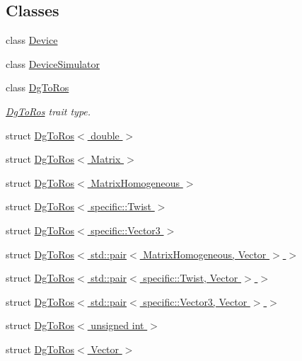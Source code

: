\subsection*{Classes}
\begin{DoxyCompactItemize}
\item 
class \hyperlink{classdynamic__graph_1_1Device}{Device}
\item 
class \hyperlink{classdynamic__graph_1_1DeviceSimulator}{Device\+Simulator}
\item 
class \hyperlink{classdynamic__graph_1_1DgToRos}{Dg\+To\+Ros}
\begin{DoxyCompactList}\small\item\em \hyperlink{classdynamic__graph_1_1DgToRos}{Dg\+To\+Ros} trait type. \end{DoxyCompactList}\item 
struct \hyperlink{structdynamic__graph_1_1DgToRos_3_01double_01_4}{Dg\+To\+Ros$<$ double $>$}
\item 
struct \hyperlink{structdynamic__graph_1_1DgToRos_3_01Matrix_01_4}{Dg\+To\+Ros$<$ Matrix $>$}
\item 
struct \hyperlink{structdynamic__graph_1_1DgToRos_3_01MatrixHomogeneous_01_4}{Dg\+To\+Ros$<$ Matrix\+Homogeneous $>$}
\item 
struct \hyperlink{structdynamic__graph_1_1DgToRos_3_01specific_1_1Twist_01_4}{Dg\+To\+Ros$<$ specific\+::\+Twist $>$}
\item 
struct \hyperlink{structdynamic__graph_1_1DgToRos_3_01specific_1_1Vector3_01_4}{Dg\+To\+Ros$<$ specific\+::\+Vector3 $>$}
\item 
struct \hyperlink{structdynamic__graph_1_1DgToRos_3_01std_1_1pair_3_01MatrixHomogeneous_00_01Vector_01_4_01_4}{Dg\+To\+Ros$<$ std\+::pair$<$ Matrix\+Homogeneous, Vector $>$ $>$}
\item 
struct \hyperlink{structdynamic__graph_1_1DgToRos_3_01std_1_1pair_3_01specific_1_1Twist_00_01Vector_01_4_01_4}{Dg\+To\+Ros$<$ std\+::pair$<$ specific\+::\+Twist, Vector $>$ $>$}
\item 
struct \hyperlink{structdynamic__graph_1_1DgToRos_3_01std_1_1pair_3_01specific_1_1Vector3_00_01Vector_01_4_01_4}{Dg\+To\+Ros$<$ std\+::pair$<$ specific\+::\+Vector3, Vector $>$ $>$}
\item 
struct \hyperlink{structdynamic__graph_1_1DgToRos_3_01unsigned_01int_01_4}{Dg\+To\+Ros$<$ unsigned int $>$}
\item 
struct \hyperlink{structdynamic__graph_1_1DgToRos_3_01Vector_01_4}{Dg\+To\+Ros$<$ Vector $>$}
\item 

\end{DoxyCompactItemize}
